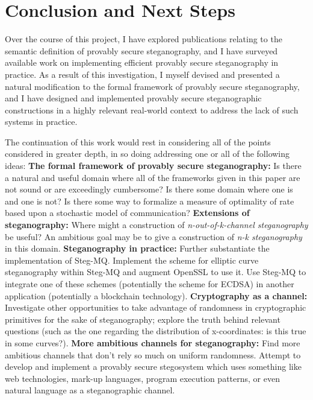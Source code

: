 \documentclass{article}
\begin{document}
\section{Conclusion and Next Steps}

Over the course of this project, I have explored publications relating to the semantic definition of provably secure 
steganography, and I have surveyed available work on implementing efficient provably secure steganography in practice.  As a 
result of this investigation, I myself devised and presented a natural modification to the formal framework of provably 
secure steganography, and I have designed and implemented provably secure steganographic constructions in a highly 
relevant real-world context to address the lack of such systems in practice.

The continuation of this work would rest in considering all of the points considered in greater depth, in so doing addressing one 
or all of the following ideas:
\newline\newline \noindent \textbf{The formal framework of provably secure steganography: } Is there a natural and useful domain where 
all of the frameworks given in this paper are not sound or are exceedingly cumbersome?  Is there some domain where one is and one is not?
Is there some way to formalize a measure of optimality of rate based upon a stochastic model of communication?
\newline\newline \noindent \textbf{Extensions of steganography: } Where might a construction of \textit{n-out-of-k-channel steganography} be useful?
An ambitious goal may be to give a construction of \textit{n-k steganography} in this domain.
\newline\newline \noindent \textbf{Steganography in practice: } Further substantiate the implementation of Steg-MQ.  Implement the scheme for 
elliptic curve steganography within Steg-MQ and augment OpenSSL to use it.  Use Steg-MQ to integrate one of these schemes (potentially the 
scheme for ECDSA) in another application (potentially a blockchain technology).
\newline\newline \noindent \textbf{Cryptography as a channel: } Investigate other opportunities to take advantage of randomness in cryptographic 
primitives for the sake of steganography; explore the truth behind relevant questions (such as the one regarding the distribution 
of x-coordinates: is this true in some curves?).
\newline\newline \noindent \textbf{More ambitious channels for steganography: } Find more ambitious channels that don't rely so much 
on uniform randomness.  Attempt to develop and implement a provably secure stegosystem which uses something like web technologies, mark-up 
languages, program execution patterns, or even natural language as a steganographic channel. 



\end{document}
